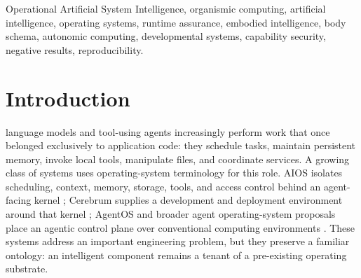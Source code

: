 \documentclass[journal,10pt]{IEEEtran}
\newcommand{\AERA}{\textsc{AERA}}
\begin{document}
\begin{abstract}
The evidence remains deliberately bounded. Internal differential and mutation campaigns support the tested \AERA{} decision semantics and no-replay discipline. An earlier vertical slice did not improve control outcomes over a comparator with the same effective controller. Two new deterministic trace simulations sharpen the effect-boundary claim: with a cooperative idempotent receiver, the strongest baseline matched OASI safety and recovered more deliveries; with a non-cooperative receiver, consume-before-dispatch with no redispatch avoided modeled duplicates but omitted modeled deliveries. Because the latter comparison lacks a policy-matched at-most-once baseline and uses repeated deterministic traces, it identifies a safety--availability policy tradeoff, not an OASI-specific advantage or a population estimate. The contribution is a falsifiable architecture, a body-bound assurance mechanism, preserved negative and diagnostic results, and a reproducible evidence program---not a completed operating system or a claim of general superiority.
\end{abstract}

\begin{IEEEkeywords}
Operational Artificial System Intelligence, organismic computing, artificial intelligence, operating systems, runtime assurance, embodied intelligence, body schema, autonomic computing, developmental systems, capability security, negative results, reproducibility.
\end{IEEEkeywords}

\section{Introduction}
 language models and tool-using agents increasingly perform work that once belonged exclusively to application code: they schedule tasks, maintain persistent memory, invoke local tools, manipulate files, and coordinate services. A growing class of systems uses operating-system terminology for this role. AIOS isolates scheduling, context, memory, storage, tools, and access control behind an agent-facing kernel \cite{mei2024aios}; Cerebrum supplies a development and deployment environment around that kernel \cite{rama2025cerebrum}; AgentOS and broader agent operating-system proposals place an agentic control plane over conventional computing environments \cite{liu2026agentos,sharma2026aos}. These systems address an important engineering problem, but they preserve a familiar ontology: an intelligent component remains a tenant of a pre-existing operating substrate.
\end{document}
